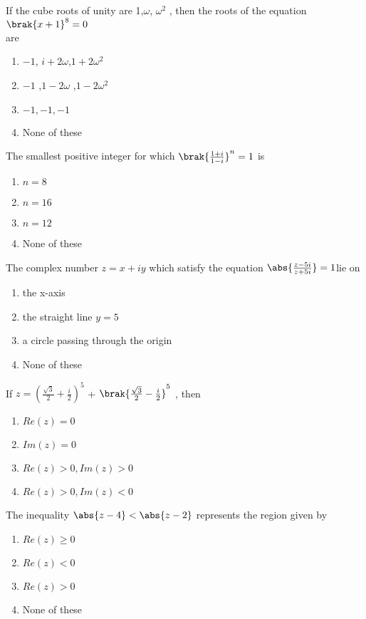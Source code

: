 \iffalse
\title{assignment}
\author{Tanush Sri Sai Petla - ai24btech11034}
\section{mcq-single}
\fi
\item If the cube roots of unity are 1,$\omega $, $\omega^2$ , then the roots of the equation $\brak{x+1}^8 = 0$ \\
	are
	\hfill{}
\begin{multicols}{2}
\begin{enumerate}
\item  $-1$, $i+2\omega$,$1+2\omega^2$
\item  $-1$ ,$1-2\omega$ ,$1-2\omega^2$
\item  $ -1 , -1 ,-1 $ 
\item  None of these
\end{enumerate}
\end{multicols}
\item The smallest positive integer for which
    $\brak{\frac{1+i}{1-i}}^n = 1$ is  \hfill{}   
\begin{multicols}{2}
\begin{enumerate}
\item  $n=8$
\item  $n=16$
\item  $n=12$
\item  None of these
\end{enumerate}
\end{multicols}
\item The complex number $z= x+iy$ which satisfy the equation \hfill{}
     $\abs{\frac{z-5i}{z+5i}} = 1 $lie on 
\begin{multicols}{2}
\begin{enumerate}
\item  the x-axis
\item  the straight line $y=5$
\item  a circle passing through the origin 
\item  None of these
\end{enumerate}
 \end{multicols}
\item If $z=(\frac{\sqrt{3}}{2} + \frac{i}{2})^5$ + $\brak{\frac{\sqrt{3}}{2} - \frac{i}{2}}^5$ , then \hfill{}
\begin{multicols}{2}
\begin{enumerate}
\item $Re(z)=0$
\item $Im(z)=0$
\item $Re(z)>0, Im(z)>0$
\item $Re(z)>0, Im(z)<0$
\end{enumerate}
\end{multicols}
\item The inequality $\abs{z-4}<\abs{z-2}$ represents the region given by \hfill{}
\begin{multicols}{2}
\begin{enumerate}
\item  $Re(z)\ge0$
\item  $Re(z)<0$ 
\item  $Re(z)>0$ 
\item  None of these
\end{enumerate}
\end{multicols}
